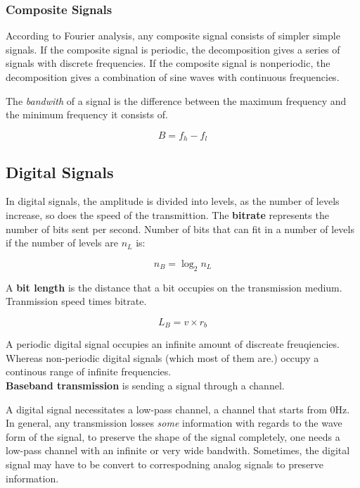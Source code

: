 \documentclass[11pt,a4paper,twoside]{book}
\begin{document}
\subsubsection{Composite Signals}

According to Fourier analysis, any composite signal consists of simpler simple signals. If the composite signal is periodic, the decomposition gives a series of signals with discrete frequencies. If the composite signal is nonperiodic, the decomposition gives a combination of sine waves with continuous frequencies.

The \textit{bandwith} of a signal is the difference between the maximum frequency and the minimum frequency it consists of.

\begin{equation}
B = f_h - f_l
\end{equation}

\subsection{Digital Signals}

In digital signals, the amplitude is divided into levels, as the number of levels increase, so does the speed of the transmittion. The \textbf{bitrate} represents the number of bits sent per second. Number of bits that can fit in a number of levels if the number of levels are $n_L$ is:

\begin{equation}
n_B = \log_2 n_L 
\end{equation}

A \textbf{bit length} is the distance that a bit occupies on the transmission medium. Tranmission speed times bitrate.

\begin{equation}
L_B = v \times r_b
\end{equation}

A periodic digital signal occupies an infinite amount of discreate freuqiencies. Whereas non-periodic digital signals (which most of them are.) occupy a continous range of infinite frequencies.\\

\textbf{Baseband transmission} is sending a signal through a channel.

A digital signal necessitates a low-pass channel, a channel that starts from 0Hz.\\

In general, any transmission losses \textit{some} information with regards to the wave form of the signal, to preserve the shape of the signal completely, one needs a low-pass channel with an infinite or very wide bandwith. Sometimes, the digital signal may have to be convert to correspodning analog signals to preserve information.\\
\end{document}
